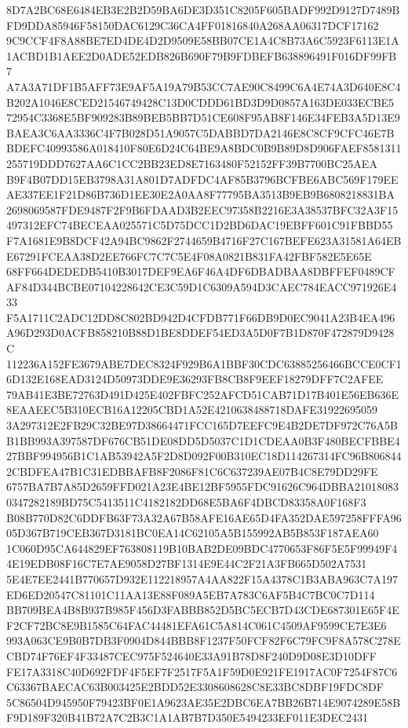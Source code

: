 \documentclass[UTF8,fontset=fandol,zihao=-4,a4paper]{ctexart}
\begin{document}
{{8D7A2BC68E6484EB3E2B2D59BA6DE3D351C8205F605BADF992D9127D7489BFD9DDA85946F58150DAC6129C36CA4FF01816840A268AA06317DCF17162
9C9CCF4F8A88BE7ED4DE4D2D9509E58BB07CE1A4C8B73A6C5923F6113E1A1ACBD1B1AEE2D0ADE52EDB826B690F79B9FDBEFB638896491F016DF99FB7
A7A3A71DF1B5AFF73E9AF5A19A79B53CC7AE90C8499C6A4E74A3D640E8C4B202A1046E8CED21546749428C13D0CDDD61BD3D9D0857A163DE033ECBE5
72954C3368E5BF909283B89BEB5BB7D51CE608F95AB8F146E34FEB3A5D13E9BAEA3C6AA3336C4F7B028D51A9057C5DABBD7DA2146E8C8CF9CFC46E7B
BDEFC40993586A018410F80E6D24C64BE9A8BDC0B9B89D8D906FAEF8581311255719DDD7627AA6C1CC2BB23ED8E7163480F52152FF39B7700BC25AEA
B9F4B07DD15EB3798A31A801D7ADFDC4AF85B3796BCFBE6ABC569F179EEAE337EE1F21D86B736D1EE30E2A0AA8F77795BA3513B9EB9B6808218831BA
2698069587FDE9487F2F9B6FDAAD3B2EEC97358B2216E3A38537BFC32A3F15497312EFC74BECEAA025571C5D75DCC1D2BD6DAC19EBFF601C91FBBD55
F7A1681E9B8DCF42A94BC9862F2744659B4716F27C167BEFE623A31581A64EBE67291FCEAA38D2EE766FC7C7C5E4F08A0821B831FA42FBF582E5E65E
68FF664DEDEDB5410B3017DEF9EA6F46A4DF6DBADBAA8DBFFEF0489CFAF84D344BCBE07104228642CE3C59D1C6309A594D3CAEC784EACC971926E433
F5A1711C2ADC12DD8C802BD942D4CFDB771F66DB9D0EC9041A23B4EA496A96D293D0ACFB858210B88D1BE8DDEF54ED3A5D0F7B1D870F472879D9428C
112236A152FE3679ABE7DEC8324F929B6A1BBF30CDC63885256466BCCE0CF16D132E168EAD3124D50973DDE9E36293FB8CB8F9EEF18279DFF7C2AFEE
79AB41E3BE72763D491D425E402FBFC252AFCD51CAB71D17B401E56EB636E8EAAEEC5B310ECB16A12205CBD1A52E4210638488718DAFE31922695059
3A297312E2FB29C32BE97D38664471FCC165D7EEFC9E4B2DE7DF972C76A5BB1BB993A397587DF676CB51DE08DD5D5037C1D1CDEAA0B3F480BECFBBE4
27BBF994956B1C1AB53942A5F2D8D092F00B310EC18D114267314FC96B8068442CBDFEA47B1C31EDBBAFB8F2086F81C6C637239AE07B4C8E79DD29FE
6757BA7B7A85D2659FFD021A23E4BE12BF5955FDC91626C964DBBA210180830347282189BD75C5413511C4182182DD68E5BA6F4DBCD83358A0F168F3
B08B770D82C6DDFB63F73A32A67B58AFE16AE65D4FA352DAE597258FFFA9605D367B719CEB367D3181BC0EA14C62105A5B155992AB5B853F187AEA60
1C060D95CA644829EF763808119B10BAB2DE09BDC4770653F86F5E5F99949F44E19EDB08F16C7E7AE9058D27BF1314E9E44C2F21A3FB665D502A7531
5E4E7EE2441B770657D932E112218957A4AA822F15A4378C1B3ABA963C7A197ED6ED20547C81101C11AA13E88F089A5EB7A783C6AF5B4C7BC0C7D114
BB709BEA4B8B937B985F456D3FABBB852D5BC5ECB7D43CDE687301E65F4EF2CF72BC8E9B1585C64FAC44481EFA61C5A814C061C4509AF9599CE7E3E6
993A063CE9B0B7DB3F0904D844BBB8F1237F50FCF82F6C79FC9F8A578C278ECBD74F76EF4F33487CEC975F524640E33A91B78D8F240D9D08E3D10DFF
FE17A3318C40D692FDF4F5EF7F2517F5A1F59D0E921FE1917AC0F7254F87C6C63367BAECAC63B003425E2BDD52E3308608628C8E33BC8DBF19FDC8DF
5C86504D945950F79423BF0E1A9623AE35E2DBC6EA7BB26B714E9074289E58BF9D189F320B41B72A7C2B3C1A1AB7B7D350E5494233EF011E3DEC2431
}}
\end{document}
